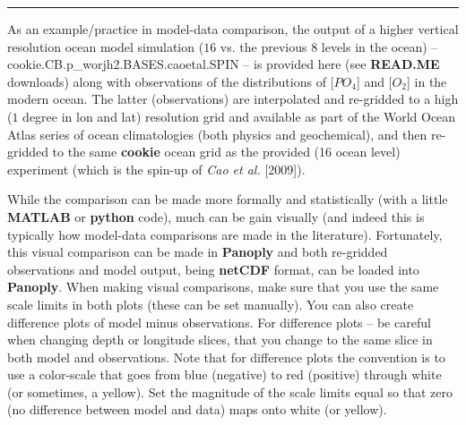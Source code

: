 \vspace{1mm} \noindent\rule{4cm}{0.5pt} \vspace{2mm}

\noindent As an example/practice in model-data comparison, the output of a higher vertical resolution ocean model simulation (\(16\) vs. the previous \(8\) levels in the ocean) -- \textsf{\footnotesize cookie.CB.p\_worjh2.BASES.caoetal.SPIN} -- is provided here (see \textbf{READ.ME} downloads) along with observations of the distributions of \([PO_{4}\)] and \([O_{2}\)] in the modern ocean. The latter (observations) are interpolated and re-gridded to a high (\(1\) degree in lon and lat) resolution grid and available as part of the World Ocean Atlas series of ocean climatologies (both physics and geochemical), and then re-gridded to the same \textbf{cookie} ocean grid as the provided (16 ocean level) experiment (which is the spin-up of \textit{Cao et al.} [2009]).

\vspace{1mm}

While the comparison can be made more formally and statistically (with a little \textbf{MATLAB} or \textbf{python} code), much can be gain visually (and indeed this is typically how model-data comparisons are made in the literature). Fortunately, this visual comparison can be made in \textbf{Panoply} and both re-gridded observations and model output, being \textbf{netCDF} format, can be loaded into \textbf{Panoply}. When making visual comparisons, make sure that you use the same scale limits in both plots (these can be set manually). You can also create difference plots of model minus observations. For difference plots -- be careful when changing depth or longitude slices, that you change to the same slice in both model and observations. Note that for difference plots the convention is to use a color-scale that goes from blue (negative) to red (positive) through white (or sometimes, a yellow). Set the magnitude of the scale limits equal so that zero (no difference between model and data) maps onto white (or yellow).

